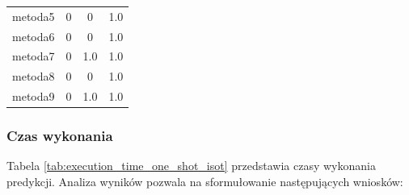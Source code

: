 \begin{table}[H]
\begin{tabular}{lccc}
		metoda5           &   0           &   0              & 1.0            \\
		metoda6           &   0           &   0              & 1.0            \\
		metoda7           &   0           & 1.0              & 1.0            \\
		metoda8           &   0           &   0              & 1.0            \\
		metoda9           &   0           & 1.0              & 1.0            \\
		\bottomrule
	\end{tabular}
\end{table}

\subsubsection{Czas wykonania}
Tabela \ref{tab:execution_time_one_shot_isot} przedstawia czasy wykonania predykcji. Analiza wyników pozwala na sformułowanie następujących wniosków:

